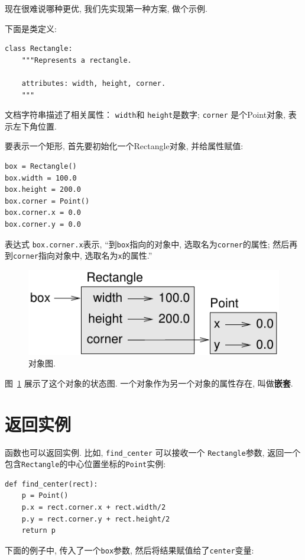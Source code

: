 \documentclass[10pt]{book}
\begin{document}
现在很难说哪种更优, 我们先实现第一种方案, 做个示例. 

下面是类定义:

\begin{verbatim}
class Rectangle:
    """Represents a rectangle. 

    attributes: width, height, corner.
    """
\end{verbatim}
%
文档字符串描述了相关属性： {\tt width}和
{\tt height}是数字; {\tt corner} 是个Point对象, 表示左下角位置. 

要表示一个矩形, 首先要初始化一个Rectangle对象, 并给属性赋值:

\begin{verbatim}
box = Rectangle()
box.width = 100.0
box.height = 200.0
box.corner = Point()
box.corner.x = 0.0
box.corner.y = 0.0
\end{verbatim}
%

表达式 {\tt box.corner.x}表示, 
``到{\tt box}指向的对象中, 选取名为{\tt corner}的属性;
然后再到{\tt corner}指向对象中, 选取名为{\tt x}的属性.''

\begin{figure}
\centerline
{\includegraphics[scale=0.8]{figs/rectangle.pdf}}
\caption{对象图.}
\label{fig.rectangle}
\end{figure}


图~\ref{fig.rectangle} 展示了这个对象的状态图. 
一个对象作为另一个对象的属性存在, 叫做{\bf 嵌套}. 


\section{返回实例}

函数也可以返回实例. 比如, \verb"find_center" 可以接收一个
 {\tt Rectangle}参数, 返回一个包含{\tt Rectangle}的中心位置坐标的{\tt Point}实例:

\begin{verbatim}
def find_center(rect):
    p = Point()
    p.x = rect.corner.x + rect.width/2
    p.y = rect.corner.y + rect.height/2
    return p
\end{verbatim}
%
下面的例子中, 传入了一个{\tt box}参数, 
然后将结果赋值给了{\tt center}变量:
\end{document}
